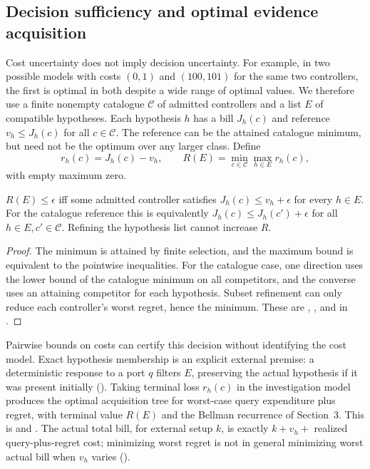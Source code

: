 \subsection{Decision sufficiency and optimal evidence acquisition}
Cost uncertainty does not imply decision uncertainty. For example, in two possible models with costs $(0,1)$ and $(100,101)$ for the same two controllers, the first is optimal in both despite a wide range of optimal values. We therefore use a finite nonempty catalogue $\mathcal C$ of admitted controllers and a list $E$ of compatible hypotheses. Each hypothesis $h$ has a bill $J_h(c)$ and reference $v_h\le J_h(c)$ for all $c\in\mathcal C$. The reference can be the attained catalogue minimum, but need not be the optimum over any larger class. Define
\[
 r_h(c)=J_h(c)-v_h,\qquad R(E)=\min_{c\in\mathcal C}\max_{h\in E}r_h(c),
\]
with empty maximum zero.
\begin{theorem}\label{thm:decision}
$R(E)\le\epsilon$ iff some admitted controller satisfies $J_h(c)\le v_h+\epsilon$ for every $h\in E$. For the catalogue reference this is equivalently $J_h(c)\le J_h(c')+\epsilon$ for all $h\in E,c'\in\mathcal C$. Refining the hypothesis list cannot increase $R$.
\end{theorem}
\begin{proof}
The minimum is attained by finite selection, and the maximum bound is equivalent to the pointwise inequalities. For the catalogue case, one direction uses the lower bound of the catalogue minimum on all competitors, and the converse uses an attaining competitor for each hypothesis. Subset refinement can only reduce each controller's worst regret, hence the minimum. These are , , and  in .
\end{proof}
Pairwise bounds on costs can certify this decision without identifying the cost model. Exact hypothesis membership is an explicit external premise: a deterministic response to a port $q$ filters $E$, preserving the actual hypothesis if it was present initially (). Taking terminal loss $r_h(c)$ in the investigation model produces the optimal acquisition tree for worst-case query expenditure plus regret, with terminal value $R(E)$ and the Bellman recurrence of Section~3. This is  and . The actual total bill, for external setup $k$, is exactly $k+v_h+$ realized query-plus-regret cost; minimizing worst regret is not in general minimizing worst actual bill when $v_h$ varies ().

